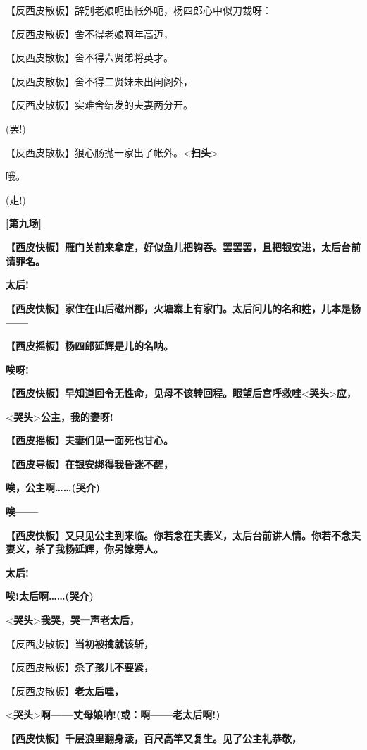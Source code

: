 【反西皮散板】辞别老娘呃出帐外呃，杨四郎心中似刀裁呀：

【反西皮散板】舍不得老娘啊年高迈，

【反西皮散板】舍不得六贤弟将英才。

【反西皮散板】舍不得二贤妹未出闺阁外，

【反西皮散板】实难舍结发的夫妻两分开。

(罢!)

【反西皮散板】狠心肠抛一家出了帐外。\textless{}\textbf{扫头}\textgreater{}

哦。

(走!)

\textbf{{[}第九场{]}}

\textbf{【西皮快板】雁门关前来拿定，好似鱼儿把钩吞。罢罢罢，且把银安进，太后台前请罪名。}

\textbf{太后!}

\textbf{【西皮快板】家住在山后磁州郡，火塘寨上有家门。太后问儿的名和姓，儿本是杨------}

\textbf{【西皮摇板】杨四郎延辉是儿的名呐。}

\textbf{唉呀!}

\textbf{【西皮快板】早知道回令无性命，见母不该转回程。眼望后宫呼救哇}\textless{}\textbf{哭头}\textgreater{}\textbf{应，}

\textless{}\textbf{哭头}\textgreater{}\textbf{公主，我的妻呀!}

\textbf{【西皮摇板】夫妻们见一面死也甘心。}

\textbf{【西皮导板】在银安绑得我昏迷不醒，}

\textbf{唉，公主啊\ldots{}\ldots{}(哭介)}

\textbf{唉------}

\textbf{【西皮快板】又只见公主到来临。你若念在夫妻义，太后台前讲人情。你若不念夫妻义，杀了我杨延辉，你另嫁旁人。}

\textbf{太后!}

\textbf{唉!太后啊\ldots{}\ldots{}(哭介)}

\textless{}\textbf{哭头}\textgreater{}\textbf{我哭，哭一声老太后，}

【反西皮散板】\textbf{当初被擒就该斩，}

【反西皮散板】\textbf{杀了孩儿不要紧，}

【反西皮散板】\textbf{老太后哇，}

\textless{}\textbf{哭头}\textgreater{}\textbf{啊------丈母娘呐!(或：啊------老太后啊!)}

\textbf{【西皮快板】千层浪里翻身滚，百尺高竿又复生。见了公主礼恭敬，}

